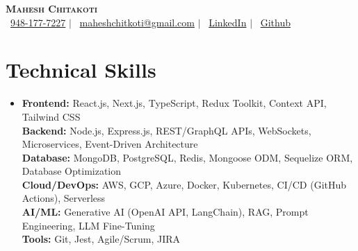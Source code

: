 \documentclass[letterpaper,11pt]{article}
\begin{document}
\begin{center}
    \textbf{\Huge \scshape Mahesh Chitakoti} \\ \vspace{1pt}
    \small \faPhone\, \href{tel:+919481777227}{948-177-7227} $|$ 
    \faEnvelope\, \href{mailto:maheshchitkoti@gmail.com}{maheshchitkoti@gmail.com} $|$ 
    \faLinkedin\, \href{https://linkedin.com/in/maheshchitakoti}{LinkedIn} $|$ 
    \faGithub\, \href{https://github.com/maheshchichkoti}{Github}
\end{center}


\section{Technical Skills}
\begin{itemize}[leftmargin=0.15in, label={}, itemsep=2pt]
  \item{
    \textbf{Frontend:} React.js, Next.js, TypeScript, Redux Toolkit, Context API, Tailwind CSS \\
    \textbf{Backend:} Node.js, Express.js, REST/GraphQL APIs, WebSockets, Microservices, Event-Driven Architecture \\
    \textbf{Database:} MongoDB, PostgreSQL, Redis, Mongoose ODM, Sequelize ORM, Database Optimization \\
    \textbf{Cloud/DevOps:} AWS, GCP, Azure, Docker, Kubernetes, CI/CD (GitHub Actions), Serverless \\
    \textbf{AI/ML:} Generative AI (OpenAI API, LangChain), RAG, Prompt Engineering, LLM Fine-Tuning \\
    \textbf{Tools:} Git, Jest, Agile/Scrum, JIRA
  }
\end{itemize}
\end{document}
